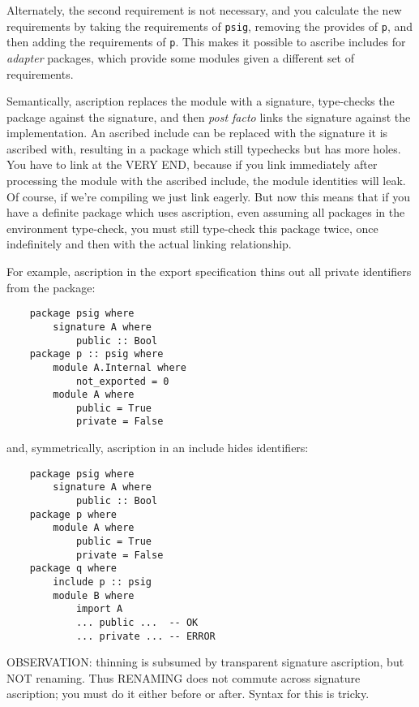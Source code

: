 \documentclass{article}
\newcommand{\Red}[1]{{\color{red} #1}}
\begin{document}
\Red{Alternately, the second requirement is not necessary, and you
calculate the new requirements by taking the requirements of \texttt{psig},
removing the provides of \texttt{p}, and then adding the requirements of \texttt{p}.
This makes it possible to ascribe includes for \emph{adapter} packages, which
provide some modules given a different set of requirements.}

Semantically, ascription replaces the module with a signature,
type-checks the package against the signature, and then \emph{post
facto} links the signature against the implementation.
An ascribed include can be replaced with the signature
it is ascribed with, resulting in a package which still typechecks
but has more holes.  \Red{You have to link at the VERY END, because
if you link immediately after processing the module with the
ascribed include, the module identities will leak.  Of course, if
we're compiling we just link eagerly.  But now this means that
if you have a definite package which uses ascription, even assuming
all packages in the environment type-check, you must still type-check
this package twice, once indefinitely and then with the actual
linking relationship.}

For example, ascription in the export specification thins out all
private identifiers from the package:

\begin{verbatim}
    package psig where
        signature A where
            public :: Bool
    package p :: psig where
        module A.Internal where
            not_exported = 0
        module A where
            public = True
            private = False
\end{verbatim}

and, symmetrically, ascription in an include hides identifiers:

\begin{verbatim}
    package psig where
        signature A where
            public :: Bool
    package p where
        module A where
            public = True
            private = False
    package q where
        include p :: psig
        module B where
            import A
            ... public ...  -- OK
            ... private ... -- ERROR
\end{verbatim}

\Red{OBSERVATION: thinning is subsumed by transparent signature ascription, but NOT renaming.  Thus RENAMING does not commute across signature ascription; you must do it either before or after.  Syntax for this is tricky.}
\end{document}
